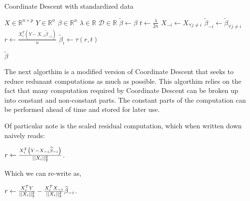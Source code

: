 \documentclass[letterpaper,11pt]{article}
\begin{document}
\FloatBarrier
\begin{algorithm}[!htbp]
  \caption{Coordinate Descent with standardized data}
  \begin{algorithmic}[1]
  \Statex
  \Input{}
  \Statex $X \in \mathbb{R}^{n \times p} $ 
  \Statex $Y \in \mathbb{R}^n$  
  \Statex $\beta \in \mathbb{R}^n$  
  \Statex $\lambda \in \mathbb{R}$  
  \Statex $\mathcal{D} \in \mathbb{R}$  
    \State $\widetilde{\beta} \gets \beta$ 
      \Do
          \State $t \gets \frac{ \lambda }{ 2 n }$ 
          \State $X_{-i} \gets X_{ \forall j \neq i}$ 
          \State $\widetilde{\beta}_{-i} \gets \widetilde{\beta}_{ \forall j \neq i}$ 
          \State $r \gets \frac{ X_i^T\left( Y - X_{-i} \widetilde{\beta}_{-i}\right) }{ n }$ 
          \State $\widetilde{\beta}_i \gets \tau \left( r, t \right)$ 
        \EndFor
      \\
  \end{algorithmic}
  \Return $\widetilde{\beta}$
\end{algorithm}
\FloatBarrier

The next algorthim is a modified version of Coordinate Descent that seeks to reduce
redunant computations as much as possible.
This algorthim relies on the fact that many computation required by
Coordinate Descent can be broken up into constant and non-constant parts. The
constant parts of the computation can be performed ahead of time and stored for later use.

Of particular note is the scaled residual computation, which when written down naively reads:

\begin{center}
$ r \gets \frac{ X_i^T\left( Y - X_{-i} \widetilde{\beta}_{-i}\right) }{ \lvert \lvert  X_i  \rvert \rvert_2^2 } $.
\end{center}

Which we can re-write as,

\begin{center}
$ r \gets \frac{ X_i^T Y }{ \lvert \lvert  X_i  \rvert \rvert_2^2 } - \frac{ X_i^T X_{-i} }{ \lvert \lvert  X_i  \rvert \rvert_2^2 } \widetilde{\beta}_{-i}$.
\end{center}
\end{document}
